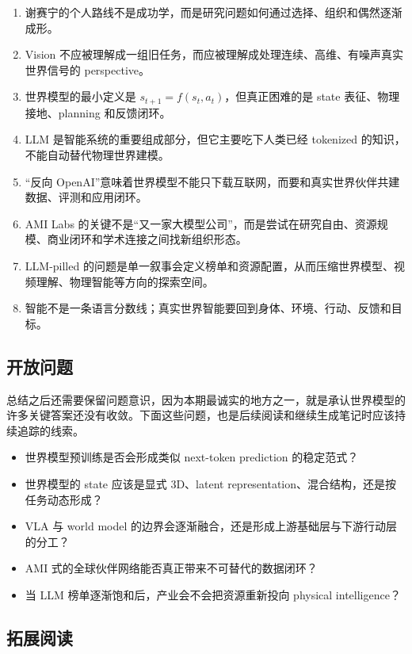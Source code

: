 \documentclass[a4paper]{article}
\begin{document}
\begin{enumerate}
\item 谢赛宁的个人路线不是成功学，而是研究问题如何通过选择、组织和偶然逐渐成形。
\item Vision 不应被理解成一组旧任务，而应被理解成处理连续、高维、有噪声真实世界信号的 perspective。
\item 世界模型的最小定义是 $s_{t+1}=f(s_t,a_t)$，但真正困难的是 state 表征、物理接地、planning 和反馈闭环。
\item LLM 是智能系统的重要组成部分，但它主要吃下人类已经 tokenized 的知识，不能自动替代物理世界建模。
\item “反向 OpenAI”意味着世界模型不能只下载互联网，而要和真实世界伙伴共建数据、评测和应用闭环。
\item AMI Labs 的关键不是“又一家大模型公司”，而是尝试在研究自由、资源规模、商业闭环和学术连接之间找新组织形态。
\item LLM-pilled 的问题是单一叙事会定义榜单和资源配置，从而压缩世界模型、视频理解、物理智能等方向的探索空间。
\item 智能不是一条语言分数线；真实世界智能要回到身体、环境、行动、反馈和目标。
\end{enumerate}

\subsection{开放问题}

总结之后还需要保留问题意识，因为本期最诚实的地方之一，就是承认世界模型的许多关键答案还没有收敛。下面这些问题，也是后续阅读和继续生成笔记时应该持续追踪的线索。

\begin{itemize}
\item 世界模型预训练是否会形成类似 next-token prediction 的稳定范式？
\item 世界模型的 state 应该是显式 3D、latent representation、混合结构，还是按任务动态形成？
\item VLA 与 world model 的边界会逐渐融合，还是形成上游基础层与下游行动层的分工？
\item AMI 式的全球伙伴网络能否真正带来不可替代的数据闭环？
\item 当 LLM 榜单逐渐饱和后，产业会不会把资源重新投向 physical intelligence？
\end{itemize}

\subsection{拓展阅读}
\end{document}
